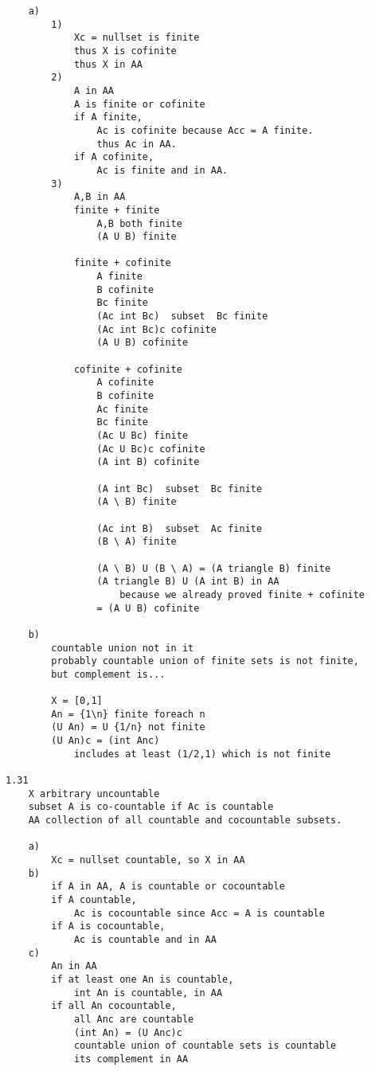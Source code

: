 \documentclass{article}
\begin{document}
\begin{flushleft}
\begin{verbatim}
    a)
        1)
            Xc = nullset is finite 
            thus X is cofinite 
            thus X in AA 
        2)
            A in AA 
            A is finite or cofinite 
            if A finite, 
                Ac is cofinite because Acc = A finite. 
                thus Ac in AA.
            if A cofinite,
                Ac is finite and in AA. 
        3)
            A,B in AA 
            finite + finite 
                A,B both finite
                (A U B) finite

            finite + cofinite 
                A finite
                B cofinite 
                Bc finite
                (Ac int Bc)  subset  Bc finite 
                (Ac int Bc)c cofinite 
                (A U B) cofinite 

            cofinite + cofinite 
                A cofinite 
                B cofinite 
                Ac finite 
                Bc finite 
                (Ac U Bc) finite 
                (Ac U Bc)c cofinite 
                (A int B) cofinite 

                (A int Bc)  subset  Bc finite 
                (A \ B) finite 

                (Ac int B)  subset  Ac finite 
                (B \ A) finite 

                (A \ B) U (B \ A) = (A triangle B) finite 
                (A triangle B) U (A int B) in AA 
                    because we already proved finite + cofinite 
                = (A U B) cofinite 
    
    b)
        countable union not in it 
        probably countable union of finite sets is not finite,
        but complement is...

        X = [0,1]
        An = {1\n} finite foreach n 
        (U An) = U {1/n} not finite
        (U An)c = (int Anc) 
            includes at least (1/2,1) which is not finite

1.31
    X arbitrary uncountable 
    subset A is co-countable if Ac is countable 
    AA collection of all countable and cocountable subsets.

    a)
        Xc = nullset countable, so X in AA 
    b)
        if A in AA, A is countable or cocountable 
        if A countable, 
            Ac is cocountable since Acc = A is countable 
        if A is cocountable, 
            Ac is countable and in AA 
    c)
        An in AA 
        if at least one An is countable, 
            int An is countable, in AA 
        if all An cocountable, 
            all Anc are countable 
            (int An) = (U Anc)c
            countable union of countable sets is countable 
            its complement in AA 
    

\end{verbatim}
\end{flushleft}
\end{document}
